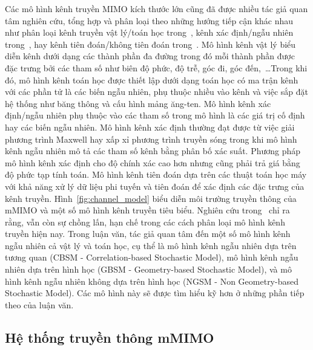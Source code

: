 Các mô hình kênh truyền MIMO kích thước lớn cũng đã được nhiều tác giả quan tâm nghiên cứu, tổng hợp và phân loại theo những hướng tiếp cận khác nhau như phân loại kênh truyền vật lý/toán học trong~\cite{Almers2007}, kênh xác định/ngẫu nhiên trong~\cite{Wang2018}, hay kênh tiên đoán/không tiên đoán trong~\cite{Feng2022}. Mô hình kênh vật lý biểu diễn kênh dưới dạng các thành phần đa đường trong đó mỗi thành phần được đặc trưng bởi các tham số như biên độ phức, độ trễ, góc đi, góc đến,~\ldots Trong khi đó, mô hình kênh toán học được thiết lập dưới dạng toán học có ma trận kênh với các phần tử là các biến ngẫu nhiên, phụ thuộc nhiều vào kênh và việc sắp đặt hệ thống như băng thông và cấu hình mảng ăng-ten. Mô hình kênh xác định/ngẫu nhiên phụ thuộc vào các tham số trong mô hình là các giá trị cố định hay các biến ngẫu nhiên. Mô hình kênh xác định thường đạt được từ việc giải phương trình Maxwell hay xấp xỉ phương trình truyền sóng trong khi mô hình kênh ngẫu nhiên mô tả các tham số kênh bằng phân bố xác suất. Phương pháp mô hình kênh xác định cho độ chính xác cao hơn nhưng cũng phải trả giá bằng độ phức tạp tính toán. Mô hình kênh tiên đoán dựa trên các thuật toán học máy với khả năng xử lý dữ liệu phi tuyến và tiên đoán để xác định các đặc trưng của kênh truyền. Hình~\ref{fig:channel_model} biểu diễn môi trường truyền thông của mMIMO và một số mô hình kênh truyền tiêu biểu. Nghiên cứu trong~\cite{Wang2018} chỉ ra rằng, vẫn còn sự chồng lấn, hạn chế trong các cách phân loại mô hình kênh truyền hiện nay. Trong luận văn, tác giả quan tâm đến một số mô hình kênh ngẫu nhiên cả vật lý và toán học, cụ thể là mô hình kênh ngẫu nhiên dựa trên tương quan (CBSM - Correlation-based Stochastic Model), mô hình kênh ngẫu nhiên dựa trên hình học (GBSM - Geometry-based Stochastic Model), và mô hình kênh ngẫu nhiên không dựa trên hình học (NGSM - Non Geometry-based Stochastic Model). Các mô hình này sẽ được tìm hiểu kỹ hơn ở những phần tiếp theo của luận văn. 

\subsection{Hệ thống truyền thông mMIMO}
\label{sec:mMIMO}

